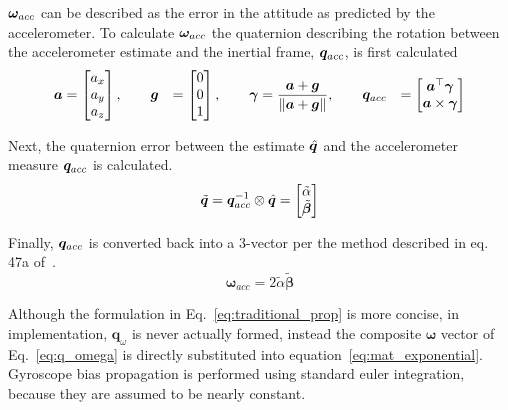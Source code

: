 \documentclass[paper=a4, fontsize=11pt]{scrartcl} %
\numberwithin{equation}{section} %
\numberwithin{figure}{section} %
\numberwithin{table}{section} %
\begin{document}
$\bm{\omega}_{acc}$ can be described as the error in the attitude as predicted by the accelerometer.  To calculate $\bm{\omega}_{acc}$ the quaternion describing the rotation between the accelerometer estimate and the inertial frame, $\bm{q}_{acc}$, is first calculated
\begin{equation}
\begin{aligned}
	\bm{a} &= 
		\begin{bmatrix}
			a_x \\
			a_y \\
			a_z \\
			\end{bmatrix},
	\qquad
	\bm{g} &=
	  \begin{bmatrix}
			0 \\
			0 \\
			1 \\
		\end{bmatrix}, \qquad
	\bm{\gamma} &= \frac{\bm{a}+\bm{g}}{\left\lVert\bm{a}+\bm{g}\right\rVert}, \qquad
	\bm{q}_{acc} &=
	  \begin{bmatrix}
	    \bm{a}^\top \bm{\gamma} \\
	    \bm{a} \times \bm{\gamma}
	  \end{bmatrix}
\end{aligned}
\end{equation}

\newcommand{\qtilde}{\tilde{\bm{q}}}
\newcommand{\betatilde}{\tilde{\bm{\beta}}}
Next, the quaternion error between the estimate $\hat{\bm{q}}$ and the accelerometer measure $\bm{q}_{acc}$ is calculated.
\begin{equation}
	\qtilde = \qmeas^{-1} \otimes \qhat = 
		\begin{bmatrix}
			\tilde{\alpha}\\
			\betatilde
		\end{bmatrix}
\end{equation}

\newcommand{\wmeas}{\bm{\omega}_{acc}}
Finally, $\bm{q}_{acc}$ is converted back into a 3-vector per the method described in eq. 47a of~\cite{Mahony2007}.
\begin{equation}
	\wmeas = 2\tilde{\alpha}\betatilde
\end{equation}

Although the formulation in Eq.~\ref{eq:traditional_prop} is more concise, in implementation, $\bm{q}_{\omega}$ is never actually formed, instead the composite $\bm{\omega}$ vector of Eq.~\ref{eq:q_omega} is directly substituted into equation~\ref{eq:mat_exponential}.  Gyroscope bias propagation is performed using standard euler integration, because they are assumed to be nearly constant.
\end{document}
